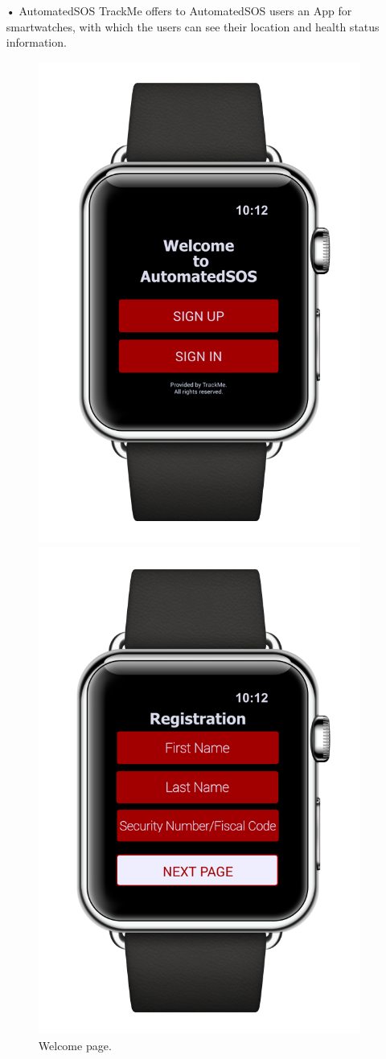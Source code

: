 \begin{enumerate}
\item[•]{\Large AutomatedSOS}
\bigbreak
\noindent
TrackMe offers to AutomatedSOS users an App for smartwatches, with which the users can see their location and health status information.
\begin{figure}[H]
\begin{center}
        \begin{minipage}[c]{.40\textwidth}
        \centering
          \includegraphics[height=12 cm]{Images/Mockups/AutomatedSOSMockup1.png}
          	\caption{Welcome page.}
        \end{minipage}%
        \hspace{10mm}%
        \begin{minipage}[c]{.40\textwidth}
        \centering
          \includegraphics[height=12 cm]{Images/Mockups/AutomatedSOSMockup6.png}

\end{minipage}
\end{center}
\end{figure}
\end{enumerate}
